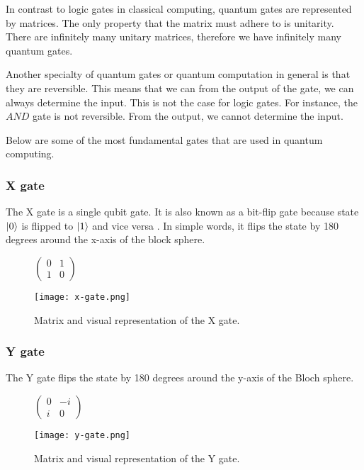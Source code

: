 In contrast to logic gates in classical computing, quantum gates are represented by matrices. The only property that the matrix must adhere to is unitarity. There are infinitely many unitary matrices, therefore we have infinitely many quantum gates. \cite{qc}

Another specialty of quantum gates or quantum computation in general is that they are reversible. This means that we can from the output of the gate, we can always determine the input. This is not the case for logic gates. For instance, the $AND$ gate is not reversible. From the output, we cannot determine the input. \cite{qc}

Below are some of the most fundamental gates that are used in quantum computing.
\subsubsection{X gate}
The X gate is a single qubit gate. It is also known as a bit-flip gate because state $\lvert0\rangle$ is flipped to $\lvert1\rangle$ and vice versa \cite{qc}. In simple words, it flips the state by 180 degrees around the x-axis of the block sphere.

\begin{figure}[H]
    \centering
    \begin{minipage}{0.4\linewidth}
      \centering
      $\begin{pmatrix}
        0 & 1 \\
        1 & 0
        \end{pmatrix}$
      \vfill
    \end{minipage}
    \begin{minipage}{0.25\linewidth}
      \centering
      \texttt{[image: x-gate.png]}
      \vfill
    \end{minipage}
    \caption{Matrix and visual representation of the X gate.}
\end{figure}


\subsubsection{Y gate}
The Y gate flips the state by 180 degrees around the y-axis of the Bloch sphere.
\begin{figure}[H]
    \centering
    \begin{minipage}{0.4\linewidth}
      \centering
      $\begin{pmatrix}
        0 & -i \\
        i & 0
        \end{pmatrix}$
      \vfill
    \end{minipage}
    \begin{minipage}{0.25\linewidth}
      \centering
      \texttt{[image: y-gate.png]}
      \vfill
    \end{minipage}
    \caption{Matrix and visual representation of the Y gate.}
\end{figure}

